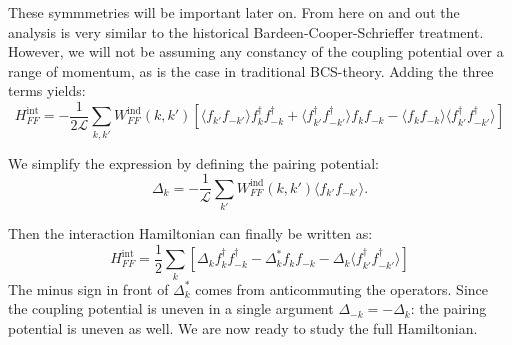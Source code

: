 These symmmetries will be important later on. From here on and out the analysis is very similar to the historical Bardeen-Cooper-Schrieffer treatment. However, we will not be assuming any constancy of the coupling potential over a range of momentum, as is the case in traditional BCS-theory\cite{Tinkham,LandauStatPhys2,PlischkeStatPhys}. Adding the three terms yields:
\begin{equation}
H^\text{int}_{FF} = -\frac{1}{2\mathcal{L}}\sum_{k,k'} W^\text{ind}_{FF}(k,k')\left[ \langle f_{k'}f_{-k'} \rangle f^\dagger_k f^\dagger_{-k} + \langle f^\dagger_{k'}f^\dagger_{-k'} \rangle f_k f_{-k} - \langle f_{k}f_{-k} \rangle  \langle f^\dagger_{k'}f^\dagger_{-k'} \rangle \right] \nonumber
\end{equation}

We simplify the expression by defining the pairing potential:
\begin{equation}
\Delta_k = -\frac{1}{\mathcal{L}}\sum_{k'}W^\text{ind}_{FF}(k,k')\langle f_{k'}f_{-k'} \rangle.
\label{eq.pairingpotentialdef}
\end{equation}

Then the interaction Hamiltonian can finally be written as:
\begin{equation}
H^\text{int}_{FF} = \frac{1}{2}\sum_{k} \left[ \Delta_k f^\dagger_k f^\dagger_{-k} - \Delta^*_k f_k f_{-k} - \Delta_k \langle f^\dagger_{k'}f^\dagger_{-k'} \rangle \right]
\label{eq.HFFintfinal}
\end{equation}
The minus sign in front of $\Delta^*_k$ comes from anticommuting the operators. Since the coupling potential is uneven in a single argument $\Delta_{-k} = -\Delta_k$: the pairing potential is uneven as well. We are now ready to study the full Hamiltonian.

